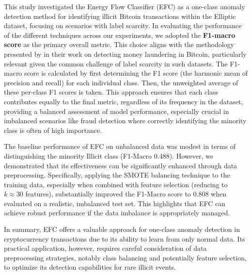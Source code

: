 \documentclass[12pt]{article}
\begin{document}
This study investigated the Energy Flow Classifier (EFC) as a one-class anomaly detection method for identifying illicit
Bitcoin transactions within the Elliptic dataset, focusing on scenarios with label scarcity. In evaluating the performance of the
different techniques across our experiments, we adopted the \textbf{F1-macro score} as the primary overall metric. This
choice aligns with the methodology presented by \cite{lorenz2021machinelearningmethodsdetect} in their work on detecting
money laundering in Bitcoin, particularly relevant given the common challenge of label scarcity in such datasets.
The F1-macro score is calculated by first determining the F1 score (the harmonic mean of precision and recall) for each
individual class. Then, the unweighted average of these per-class F1 scores is taken. This approach ensures that each class
contributes equally to the final metric, regardless of its frequency in the dataset, providing a balanced assessment of
model performance, especially crucial in imbalanced scenarios like fraud detection where correctly identifying the minority
class is often of high importance.

The baseline performance of EFC on unbalanced data was modest in terms of distinguishing the minority Illicit class
(F1-Macro 0.488). However, we demonstrated that its effectiveness can be significantly enhanced through data preprocessing.
Specifically, applying the SMOTE balancing technique to the training data, especially when combined with feature selection
(reducing to $k \approx 30$ features), substantially improved the F1-Macro score to 0.808 when evaluated on a realistic,
imbalanced test set. This highlights that EFC can achieve robust performance if the data imbalance is appropriately managed.

In summary, EFC offers a valuable approach for one-class anomaly detection in cryptocurrency transactions due to its ability
to learn from only normal data. Its practical application, however, requires careful consideration of data preprocessing
strategies, notably class balancing and potentially feature selection, to optimize its detection capabilities for rare illicit
events.



\end{document}
